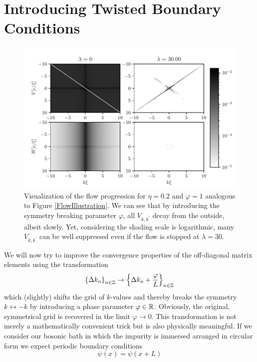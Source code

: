 \section{Introducing Twisted Boundary Conditions}
\begin{figure}[H]
    \centering
    \includegraphics[width=\textwidth]{figures/plots/PDF/FlowIllustrationPhi.pdf}
    \caption[Flow Visualization for $\eta=0.2$ and $\varphi = 1$]{Visualization of the flow progression for $\eta=0.2$ and $\varphi = 1$ analogous to Figure \ref{FlowIllustration}. We can see that by introducing the symmetry breaking parameter $\varphi$, all $V_{k,k^\prime}$ decay from the outside, albeit slowly. Yet, considering the shading scale is logarithmic, many $V_{k,k^\prime}$ can be well suppressed even if the flow is stopped at $\lambda=30$.}
    \label{FlowIllustrationPhi}
\end{figure}
We will now try to improve the convergence properties of the off-diagonal matrix elements using the transformation
\begin{equation} \label{twisted_trafo}
\left\{\Delta k_n\right\}_{n\in\mathbb{Z}}\rightarrow \left\{\Delta k_n+\frac{\varphi}{L}\right\}_{n\in\mathbb{Z}}
\end{equation}
 which (slightly) shifts the grid of $k$-values and thereby breaks the symmetry $k\leftrightarrow -k$ by introducing a phase parameter $\varphi\in\mathbb{R}$. Obviously, the original, symmetrical grid is recovered in the limit $\varphi\rightarrow 0$. 
This transformation is not merely a mathematically convenient trick but is also physically meaningful. If we consider our bosonic bath in which the impurity is immersed arranged in circular form we expect periodic boundary conditions
\begin{equation}
\psi(x)=\psi(x+L)
\end{equation}

